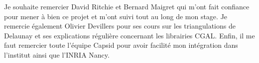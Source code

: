 Je souhaite remercier David Ritchie et Bernard Maigret qui m'ont fait confiance
pour mener à bien ce projet et m'ont suivi tout au long de mon stage. Je
remercie également Olivier Devillers pour ses cours sur les triangulations de Delaunay
et ses explications régulière concernant les librairies CGAL. Enfin, il me faut
remercier toute l'équipe Capsid pour avoir facilité mon intégration dans l'institut ainsi
que l'INRIA Nancy.
